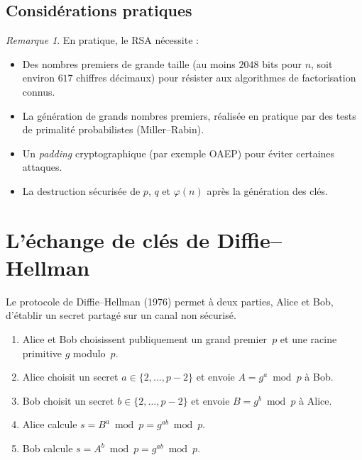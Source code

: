 \documentclass[12pt,a4paper,openany]{book}
\theoremstyle{definition}
\theoremstyle{plain}
\theoremstyle{remark}
\newtheorem{remarque}[definition]{Remarque}
\begin{document}
\subsection{Considérations pratiques}
\label{subsec:RSA-pratique}

\begin{remarque}
En pratique, le RSA nécessite :
\begin{itemize}
  \item Des nombres premiers de grande taille (au moins $2048$ bits pour $n$,
    soit environ $617$ chiffres décimaux) pour résister aux algorithmes de
    factorisation connus.
  \item La génération de grands nombres premiers, réalisée en pratique par des
    tests de primalité probabilistes (Miller--Rabin).
  \item Un \emph{padding} cryptographique (par exemple OAEP)
    pour éviter certaines attaques.
  \item La destruction sécurisée de $p$, $q$ et $\varphi(n)$ après la génération
    des clés.
\end{itemize}
\end{remarque}

\section{L'échange de clés de Diffie--Hellman}
\label{sec:diffie-hellman}

Le protocole de Diffie--Hellman (1976) permet à deux
parties, Alice et Bob, d'établir un secret partagé sur un canal non sécurisé.

\begin{enumerate}
  \item Alice et Bob choisissent publiquement un grand premier~$p$ et une racine
    primitive $g$ modulo~$p$.
  \item Alice choisit un secret $a \in \{2, \ldots, p-2\}$ et envoie
    $A = g^a \bmod p$ à Bob.
  \item Bob choisit un secret $b \in \{2, \ldots, p-2\}$ et envoie
    $B = g^b \bmod p$ à Alice.
  \item Alice calcule $s = B^a \bmod p = g^{ab} \bmod p$.
  \item Bob calcule $s = A^b \bmod p = g^{ab} \bmod p$.
\end{enumerate}
\end{document}
